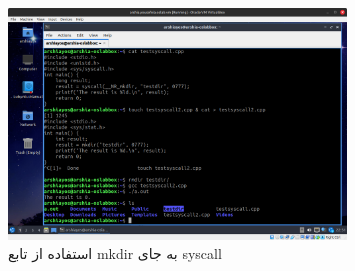 \documentclass[12pt]{article}
\begin{document}
        \begin{figure}[H]
		\centering
		\includegraphics[width=0.8\textwidth]{report2-resources/6.png}
		\caption{استفاده از تابع \textenglish{mkdir} به جای \textenglish{syscall}}
	\end{figure}
\end{document}
